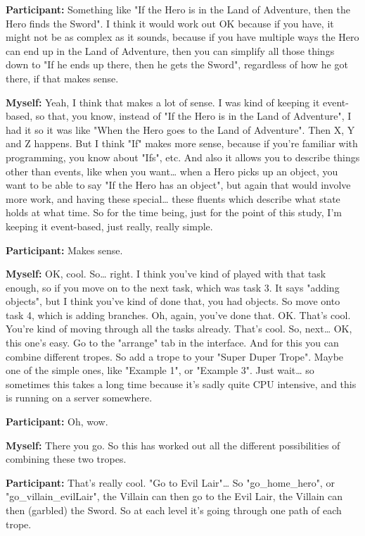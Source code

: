 \documentclass[11pt]{report}
\begin{document}
\begin{linenumbers}
\textbf{Participant:} Something like "If the Hero is in the Land of Adventure, then the Hero finds the Sword". I think it would work out OK because if you have, it might not be as complex as it sounds, because if you have multiple ways the Hero can end up in the Land of Adventure, then you can simplify all those things down to "If he ends up there, then he gets the Sword", regardless of how he got there, if that makes sense.

\textbf{Myself:} Yeah, I think that makes a lot of sense. I was kind of keeping it event-based, so that, you know, instead of "If the Hero is in the Land of Adventure", I had it so it was like "When the Hero goes to the Land of Adventure". Then X, Y and Z happens. But I think "If" makes more sense, because if you're familiar with programming, you know about "Ifs", etc. And also it allows you to describe things other than events, like when you want\ldots{} when a Hero picks up an object, you want to be able to say "If the Hero has an object", but again that would involve more work, and having these special\ldots{} these fluents which describe what state holds at what time. So for the time being, just for the point of this study, I'm keeping it event-based, just really, really simple.

\textbf{Participant:} Makes sense.

\textbf{Myself:} OK, cool. So\ldots{} right. I think you've kind of played with that task enough, so if you move on to the next task, which was task 3. It says "adding objects", but I think you've kind of done that, you had objects. So move onto task 4, which is adding branches. Oh, again, you've done that. OK. That's cool. You're kind of moving through all the tasks already. That's cool. So, next\ldots{} OK, this one's easy. Go to the "arrange" tab in the interface. And for this you can combine different tropes. So add a trope to your "Super Duper Trope". Maybe one of the simple ones, like "Example 1", or "Example 3". Just wait\ldots{} so sometimes this takes a long time because it's sadly quite CPU intensive, and this is running on a server somewhere.

\textbf{Participant:} Oh, wow.

\textbf{Myself:} There you go. So this has worked out all the different possibilities of combining these two tropes.

\textbf{Participant:} That's really cool. "Go to Evil Lair"\ldots{} So "go_home_hero", or "go_villain_evilLair", the Villain can then go to the Evil Lair, the Villain can then (garbled) the Sword. So at each level it's going through one path of each trope.


\end{linenumbers}
\end{document}
